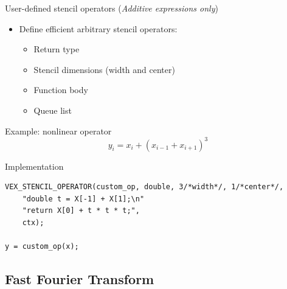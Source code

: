 \documentclass[@BEAMER_OPTIONS@]{beamer}
\newcommand{\additive}{\hspace{1cm}\footnotesize(\emph{Additive expressions only})}
\begin{document}
\begin{frame}[fragile]{User-defined stencil operators \additive}
    \begin{itemize}
        \item Define efficient arbitrary stencil operators:
            \begin{itemize}
                \item Return type
                \item Stencil dimensions (width and center)
                \item Function body
                \item Queue list
            \end{itemize}
    \end{itemize}
    \begin{block}{Example: nonlinear operator}
        \begin{equation*}
            y_i = x_i + \left( x_{i-1} + x_{i+1} \right)^3
        \end{equation*}
    \end{block}
    \begin{exampleblock}{Implementation}
        \begin{lstlisting}
VEX_STENCIL_OPERATOR(custom_op, double, 3/*width*/, 1/*center*/,
    "double t = X[-1] + X[1];\n"
    "return X[0] + t * t * t;",
    ctx);

y = custom_op(x);
        \end{lstlisting}
    \end{exampleblock}
\end{frame}


\subsection{Fast Fourier Transform}
\end{document}
